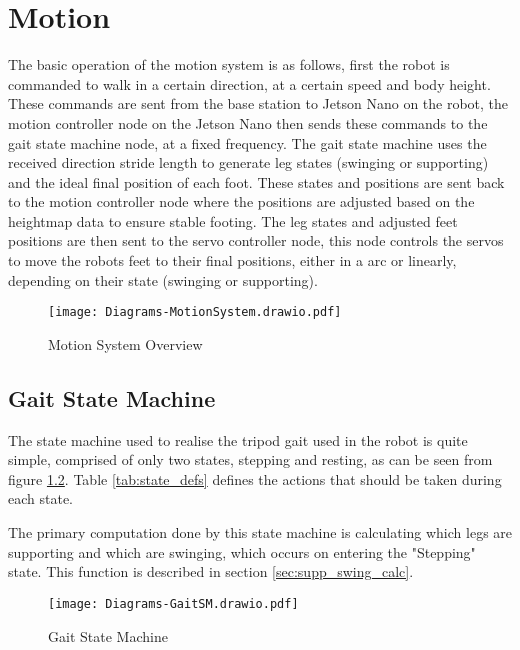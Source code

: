 \chapter{Motion}
The basic operation of the motion system is as follows, first the robot is commanded to walk in a certain direction, at a
certain speed and body height. These commands are sent from the base station to Jetson Nano on the robot,
the motion controller node on the Jetson Nano then sends these commands to the gait state machine node, at a fixed frequency.
The gait state machine uses the received direction stride length to generate leg states (swinging or supporting) and the ideal
final position of each foot. These states and positions are sent back to the motion controller node where the positions are adjusted
based on the heightmap data to ensure stable footing. The leg states and adjusted feet positions are then sent to the servo 
controller node, this node controls the servos to move the robots feet to their final positions, either in a arc or linearly,
depending on their state (swinging or supporting). %

\begin{figure}[h]
    \centering
    \texttt{[image: Diagrams-MotionSystem.drawio.pdf]}
    \caption{Motion System Overview}
    \label{fig:motion_system}
\end{figure}

\section{Gait State Machine}
The state machine used to realise the tripod gait used in the robot is quite simple, comprised of only two states, stepping and
resting, as can be seen from figure \ref{fig:gaitSM}. Table \ref{tab:state_defs} defines the actions that should be taken during
each state.

The primary computation done by this state machine is calculating which legs are supporting and which are swinging, which occurs
on entering the "Stepping" state. This function is described in section \ref{sec:supp_swing_calc}.

\begin{figure}[h]
    \centering
    \texttt{[image: Diagrams-GaitSM.drawio.pdf]}
    \caption{Gait State Machine}
    \label{fig:gaitSM}
\end{figure}

